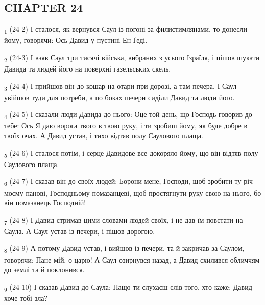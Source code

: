 \subsection{CHAPTER 24}
\begin{tcolorbox}
\textsubscript{1} (24-2) І сталося, як вернувся Саул із погоні за филистимлянами, то донесли йому, говорячи: Ось Давид у пустині Ен-Ґеді.
\end{tcolorbox}
\begin{tcolorbox}
\textsubscript{2} (24-3) І взяв Саул три тисячі війська, вибраних з усього Ізраїля, і пішов шукати Давида та людей його на поверхні газельських скель.
\end{tcolorbox}
\begin{tcolorbox}
\textsubscript{3} (24-4) І прийшов він до кошар на отари при дорозі, а там печера. І Саул увійшов туди для потреби, а по боках печери сиділи Давид та люди його.
\end{tcolorbox}
\begin{tcolorbox}
\textsubscript{4} (24-5) І сказали люди Давида до нього: Оце той день, що Господь говорив до тебе: Ось Я даю ворога твого в твою руку, і ти зробиш йому, як буде добре в твоїх очах. А Давид устав, і тихо відтяв полу Саулового плаща.
\end{tcolorbox}
\begin{tcolorbox}
\textsubscript{5} (24-6) І сталося потім, і серце Давидове все докоряло йому, що він відтяв полу Саулового плаща.
\end{tcolorbox}
\begin{tcolorbox}
\textsubscript{6} (24-7) І сказав він до своїх людей: Борони мене, Господи, щоб зробити ту річ моєму панові, Господньому помазанцеві, щоб простягнути руку свою на нього, бо він помазанець Господній!
\end{tcolorbox}
\begin{tcolorbox}
\textsubscript{7} (24-8) І Давид стримав цими словами людей своїх, і не дав їм повстати на Саула. А Саул устав із печери, і пішов дорогою.
\end{tcolorbox}
\begin{tcolorbox}
\textsubscript{8} (24-9) А потому Давид устав, і вийшов із печери, та й закричав за Саулом, говорячи: Пане мій, о царю! А Саул озирнувся назад, а Давид схилився обличчям до землі та й поклонився.
\end{tcolorbox}
\begin{tcolorbox}
\textsubscript{9} (24-10) І сказав Давид до Саула: Нащо ти слухаєш слів того, хто каже: Давид хоче тобі зла?
\end{tcolorbox}
